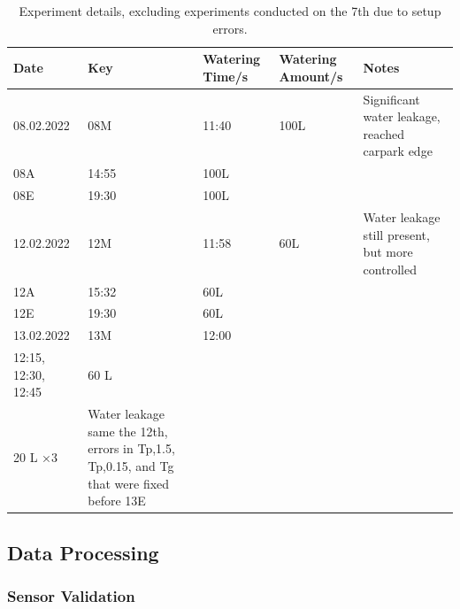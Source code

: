 \documentclass[final,3p,times,authoryear]{elsarticle}
\begin{document}
\begin{table}[!ht]
\begin{tabular}{|p{0.90cm}|p{2.0cm}|p{2.0cm}|p{3.5cm}|p{2.5cm}|p{1.0cm}|p{1.0cm}|}
              	
            
            
    \end{tabular}\label{table:2.1}
\end{table}




\begin{table}[!ht]\caption{Experiment details, excluding experiments conducted on the 7th due to setup errors.}
    \centering
    \begin{tabular}{|p{2.0cm}|p{2.0cm}|p{2.0cm}|p{2.0cm}|p{3.0cm}|}
    \hline
        Date & Key & Watering Time/s & Watering Amount/s & Notes \\ \hline
        08.02.2022 & 08M & 11:40 & 100L & Significant water leakage, reached carpark edge \\ \hline
        08A & 14:55 & 100L & ~ & ~ \\ \hline
        08E & 19:30 & 100L & ~ & ~ \\ \hline
        12.02.2022 & 12M & 11:58 & 60L & Water leakage still present, but more controlled \\ \hline
        12A & 15:32 & 60L & ~ & ~ \\ \hline
        12E & 19:30 & 60L & ~ & ~ \\ \hline
        13.02.2022 & 13M & 12:00 & ~ & ~ \\ \hline
        12:15, 12:30, 12:45 & 60 L & ~ & ~ & ~ \\ \hline
        20 L ×3 & Water leakage same the 12th, errors in Tp,1.5, Tp,0.15, and Tg that were fixed before 13E & ~ & ~ & ~ \\ \hline
    \end{tabular}\label{table:2.2}
\end{table}

\subsection{Data Processing}\label{sec:methods2.2}

\subsubsection{Sensor Validation}\label{sec:methods2.2.1}
\end{document}

